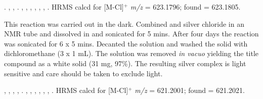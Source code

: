 \begin{sloppypar}
.
,
,
.
,
,
,
,
,
,
.
HRMS calcd for  [M-Cl]$^+$ \emph{m/z} = 623.1796; found = 623.1805.
\end{sloppypar}



This reaction was carried out in the dark.  Combined \tBusixantphos{} and silver chloride in an NMR tube and dissolved in  and sonicated for 5 mins.  After four days the reaction was sonicated for 6 x 5 mins.  Decanted the solution and washed the solid with dichloromethane (3 x 1 mL).  The solution was removed \emph{in vacuo} yielding the title compound as a white solid (31 mg, 97\%).  The resulting silver complex is light sensitive and care should be taken to exclude light.

\begin{sloppypar}
,
,
,
,
.
,
,
,
,
,
,
.
HRMS calcd for  [M-Cl]$^+$ \emph{m/z} = 621.2001; found = 621.2021.
\end{sloppypar}

